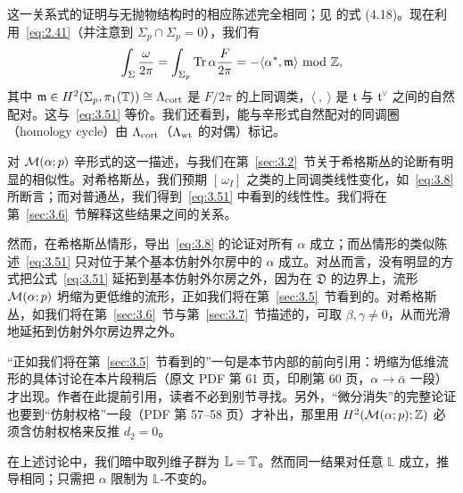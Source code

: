 这一关系式的证明与无抛物结构时的相应陈述完全相同；见 \cite{ref8} 的式 (4.18)。现在利用~\eqref{eq:2.41}（并注意到 $\Sigma_p\cap \Sigma_p=0$），我们有
\setcounter{equation}{52}
\begin{equation}\label{eq:3.53}
  \int_{\Sigma}{\omega\over 2\pi}=\int_{\Sigma_p}{\rm Tr}\,{\alpha}{F\over 2\pi}
     =-\langle \alpha^*,\mathfrak{m}\rangle~{\rm mod}~{\mathbb{Z}},
\end{equation}
其中 $\mathfrak{m}\in H^2(\Sigma_p,\pi_1({\mathbb{T}}))\cong \Lambda_{{\rm cort}}$ 是 $F/2\pi$ 的上同调类，$\langle~,~\rangle$ 是 $\mathfrak t$ 与 $\mathfrak t^\vee$ 之间的自然配对。这与~\eqref{eq:3.51} 等价。我们还看到，能与辛形式自然配对的同调圈（homology cycle）由 $\Lambda_{{\rm cort}}$（$\Lambda_{{\rm wt}}$ 的对偶）标记。

对 ${\mathcal{M}}(\alpha;p)$ 辛形式的这一描述，与我们在第~\ref{sec:3.2}~节关于希格斯丛的论断有明显的相似性。对希格斯丛，我们预期 $[\,\omega_I]$ 之类的上同调类线性变化，如~\eqref{eq:3.8} 所断言；而对普通丛，我们得到~\eqref{eq:3.51} 中看到的线性性。我们将在第~\ref{sec:3.6}~节解释这些结果之间的关系。

然而，在希格斯丛情形，导出~\eqref{eq:3.8} 的论证对所有 $\alpha$ 成立；而丛情形的类似陈述~\eqref{eq:3.51} 只对位于某个基本仿射外尔房中的 $\alpha$ 成立。对丛而言，没有明显的方式把公式~\eqref{eq:3.51} 延拓到基本仿射外尔房之外，因为在 $\mathfrak{D}$ 的边界上，流形 ${\mathcal{M}}(\alpha;p)$ 坍缩为更低维的流形，正如我们将在第~\ref{sec:3.5}~节看到的。对希格斯丛，如我们将在第~\ref{sec:3.6}~节与第~\ref{sec:3.7}~节描述的，可取 $\beta,\gamma\not=0$，从而光滑地延拓到仿射外尔房边界之外。

\begin{yizhu}[含糊点拨]“正如我们将在第~\ref{sec:3.5}~节看到的”一句是本节内部的前向引用：坍缩为低维流形的具体讨论在本片段稍后（原文 PDF 第 61 页，印刷第 60 页，$\alpha\to\bar\alpha$ 一段）才出现。作者在此提前引用，读者不必到别节寻找。另外，“微分消失”的完整论证也要到“仿射权格”一段（PDF 第 57--58 页）才补出，那里用 $H^2({\mathcal{M}}(\alpha;p);{\mathbb{Z}})$ 必须含仿射权格来反推 $d_2=0$。\end{yizhu}

在上述讨论中，我们暗中取列维子群为 $\mathbb{L}={\mathbb{T}}$。然而同一结果对任意 $\mathbb{L}$ 成立，推导相同；只需把 $\alpha$ 限制为 $\mathbb{L}$-不变的。

\bigskip{}

